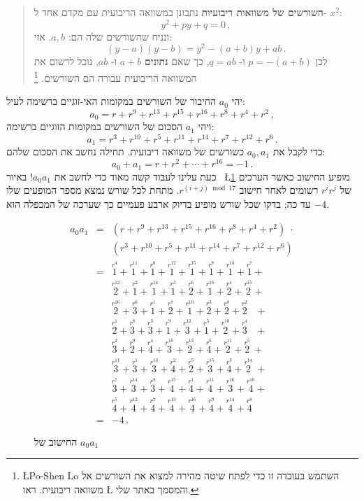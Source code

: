 \documentclass[11pt,a4paper]{article}
\newenvironment{form}[1]{%
\begin{displaymath}%
\renewcommand{\arraystretch}{#1}%
\begin{array}{lcl}}%
{\end{array}%
\end{displaymath}%
}
\newcommand*{\occ}[2]{%
  \stackrel{%
    \textstyle r^{#1}}%
    {\!\!\!\scriptscriptstyle #2}}
\begin{document}
\begin{quote}
\textbf{%
השורשים של משוואות ריבועיות%
}
נתבונן במשוואה הריבועית עם מקדם אחד ל-%
$x^2$:
\[
y^2+py+q=0\,,
\]
ונניח שהשורשים שלה הם:
$a,b$.
אזי:
\[
(y-a)(y-b)=y^2 - (a+b)y + ab\,.
\]
לכן
$p=-(a+b)$
ו-%
$q=ab$,
כך שאם
\textbf{נתונים}
$a+b$
ו-%
$ab$,
נוכל לרשום את המשוואה הריבועית עבורה הם השורשים.%
\footnote{%
\L{Po-Shen Lo}
השתמש בעובדה זו כדי לפתח שיטה מהירה למצוא את השורשים אל משוואה ריבועית. ראו
\L{\cite{lo}}
והמסמך באתר שלי.
}
\end{quote}
יהי
$a_0$
החיבור של השורשים במקומות האי-זוגיים ברשימה לעיל:
\[
a_0=r + r^9 + r^{13} +r^{15} +r^{16} + r^8+r^4+r^2\,,
\]
ויהי
$a_1$
הסכום של השורשים במקומות הזוגיים ברשימה:
\[
a_1=r^3 + r^{10} + r^{5} +r^{11} +r^{14} + r^7+r^{12}+r^6\,.
\]
כדי לקבל את
$a_0,a_1$
כשורשים של משוואה ריבועית. תחילה נחשב את הסכום שלהם:
\[
a_0+a_1=r + r^2 + \cdots +r^{16}=-1\,.
\]
כעת עלינו לעבוד קשה מאוד כדי לחשב את
$a_0a_1$!
באיור%
~\L{\ref{fig.a0a1}}
מופיע החישוב כאשר הערכים של
$r^ir^j$
רשומים לאחר חישוב
$r^{(i+j) \bmod 17}$.
מתחת לכל שורש נמצא מספר המופעים שלו עד כה;
בדקו שכל שורש מופיע בדיוק ארבע פעמיים כך שערכה של המכפלה הוא 
$-4$.
\begin{figure}[tb]
\begin{form}{1.5}
a_0a_1&=&(r + r^9 + r^{13} +r^{15} +r^{16} + r^8+r^4+r^2)\;\cdot\\
&&(r^3 + r^{10} + r^{5} +r^{11} +r^{14} + r^7+r^{12}+r^6)\\
&=&\occ{4}{1} + \occ{11}{1} + \occ{6}{1} + \occ{12}{1} + \occ{15}{1} + \occ{8}{1} + \occ{13}{1} + \occ{7}{1} +\\

&&\occ{12}{2} + \occ{2}{1} + \occ{14}{1} + \occ{3}{1} + \occ{6}{2} + \occ{16}{1} + \occ{4}{2} + \occ{15}{2} +\\

&&\occ{16}{2} + \occ{6}{3} + \occ{1}{1} + \occ{7}{2} + \occ{10}{1} + \occ{3}{2} + \occ{8}{2} + \occ{2}{2}\;\;\: +\\

&&\occ{1}{2} + \occ{8}{3} + \occ{3}{3} + \occ{9}{1} + \occ{12}{3} + \occ{5}{1} + \occ{10}{2} + \occ{4}{3}\;\;\: +\\

&&\occ{2}{3} + \occ{9}{2} + \occ{4}{4} + \occ{10}{3} + \occ{13}{2} + \occ{6}{4} + \occ{11}{2} + \occ{5}{2} \:+\\

&&\occ{11}{3} + \occ{1}{3} + \occ{13}{3} + \occ{2}{4} + \occ{5}{2} + \occ{15}{3} + \occ{3}{4} + \occ{14}{2} \;+\\

&&\occ{7}{3} + \occ{14}{3} + \occ{9}{3} + \occ{15}{4} + \occ{1}{4} + \occ{11}{4} + \occ{16}{3} + \occ{10}{4} +\\

&&\occ{5}{4} + \occ{12}{4} + \occ{7}{4} + \occ{13}{4} + \occ{16}{4} + \occ{9}{4} + \occ{14}{4} + \occ{8}{4}\\
&=&-4\,.
\end{form}\vspace{-2em}
\caption{החישוב של $a_0a_1$}\label{fig.a0a1}
\end{figure}
\end{document}
